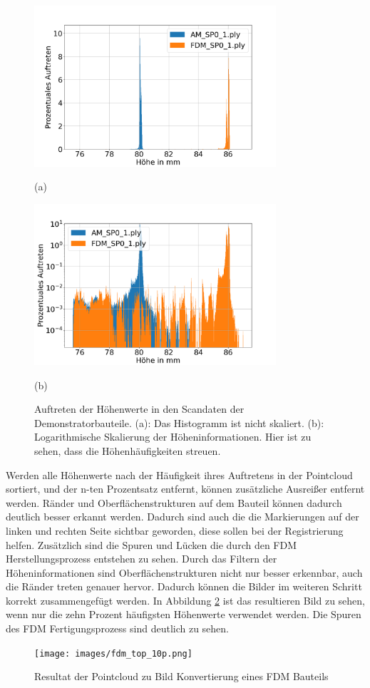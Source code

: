 \begin{figure}[H]
    \centering
    \begin{minipage}{\textwidth}
        \centering
        \includegraphics[width=0.8\textwidth]{images/height_occurange.png} %
        \caption*{(a)}
    \end{minipage}\hfill
    \begin{minipage}{\textwidth}
        \centering
        \includegraphics[width=0.8\textwidth]{images/height_occurange_log.png} %
        \caption*{(b)}
    \end{minipage}
    \caption{Auftreten der Höhenwerte in den Scandaten der Demonstratorbauteile. 
    (a): Das Histogramm ist nicht skaliert. (b): Logarithmische Skalierung der 
    Höheninformationen. Hier ist zu sehen, dass die Höhenhäufigkeiten streuen.}
    \label{fig:brightness}
\end{figure}

Werden alle Höhenwerte nach der Häufigkeit ihres 
Auftretens in der Pointcloud sortiert, und der n-ten Prozentsatz entfernt, können
zusätzliche Ausreißer entfernt werden.
Ränder und Oberflächenstrukturen auf dem Bauteil können dadurch deutlich besser erkannt werden. 
Dadurch sind auch die die Markierungen auf der linken und rechten Seite sichtbar geworden,
diese sollen bei der Registrierung helfen. 
Zusätzlich sind die Spuren und Lücken die durch den FDM 
Herstellungsprozess entstehen zu sehen.
Durch das Filtern der Höheninformationen sind Oberflächenstrukturen nicht nur besser
erkennbar, auch die Ränder treten genauer hervor. 
Dadurch können die Bilder im weiteren Schritt korrekt zusammengefügt werden.
In Abbildung \ref{fig:10p} ist das resultieren Bild zu sehen, wenn nur die zehn Prozent
häufigsten Höhenwerte verwendet werden.
Die Spuren des FDM Fertigungsprozess sind deutlich zu sehen.

\begin{figure}[H]
    \centering
    \texttt{[image: images/fdm\_top\_10p.png]}
    \caption{Resultat der Pointcloud zu Bild Konvertierung eines FDM Bauteils}
    \label{fig:10p}
\end{figure}
